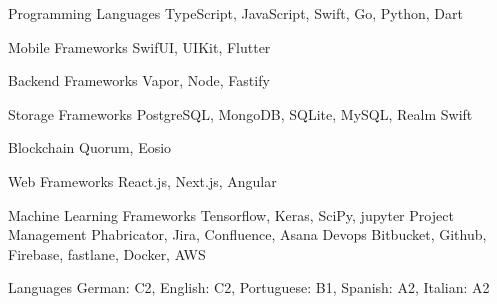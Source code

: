 

\begin{cvskills}

\cvskill
{Programming Languages} %
{TypeScript, JavaScript, Swift, Go, Python, Dart} %
\vspace{0.4cm}

\cvskill
{Mobile Frameworks} %
{SwifUI, UIKit, Flutter} %
\vspace{0.4cm}

\cvskill
{Backend Frameworks} %
{Vapor, Node, Fastify} %
\vspace{0.4cm}

\cvskill
{Storage Frameworks} %
{PostgreSQL, MongoDB, SQLite, MySQL, Realm Swift} %
\vspace{0.4cm}

\cvskill
{Blockchain} %
{Quorum, Eosio} %
\vspace{0.4cm}

\cvskill
{Web Frameworks} %
{React.js, Next.js, Angular} %
\vspace{0.4cm}

\cvskill
{Machine Learning Frameworks} %
{Tensorflow, Keras, SciPy, jupyter} %
\vspace{0.4cm}
\cvskill
{Project Management} %
{Phabricator, Jira, Confluence, Asana} %
\vspace{0.4cm}
\cvskill
{Devops} %
{Bitbucket, Github, Firebase, fastlane, Docker, AWS} %
\vspace{0.4cm}


\cvskill
{Languages} %
{German: C2, English: C2, Portuguese: B1, Spanish: A2, Italian: A2} %


\end{cvskills}